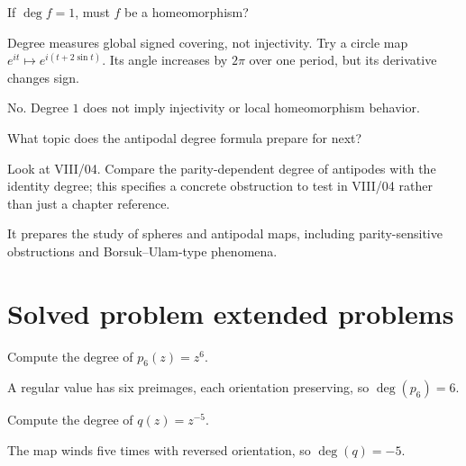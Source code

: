 \begin{exercise}\label{exr:viii03-23}
If \(\deg f=1\), must \(f\) be a homeomorphism?
\end{exercise}
\begin{hint}Degree measures global signed covering, not injectivity.
Try a circle map \(e^{it}\mapsto e^{i(t+2\sin t)}\). Its angle increases by \(2\pi\) over one period, but its derivative changes sign.
\end{hint}
\begin{solution}
No.  Degree \(1\) does not imply injectivity or local homeomorphism behavior.
\end{solution}

\begin{exercise}\label{exr:viii03-24}
What topic does the antipodal degree formula prepare for next?
\end{exercise}
\begin{hint}Look at VIII/04.
Compare the parity-dependent degree of antipodes with the identity degree; this specifies a concrete obstruction to test in VIII/04 rather than just a chapter reference.
\end{hint}
\begin{solution}
It prepares the study of spheres and antipodal maps, including parity-sensitive
obstructions and Borsuk--Ulam-type phenomena.
\end{solution}

\section{Solved problem extended problems}

\begin{problem}\label{prob:viii03-01}
Compute the degree of \(p_6(z)=z^6\).
\end{problem}
\begin{solution}
A regular value has six preimages, each orientation preserving, so
\(\deg(p_6)=6\).
\end{solution}

\begin{problem}\label{prob:viii03-02}
Compute the degree of \(q(z)=z^{-5}\).
\end{problem}
\begin{solution}
The map winds five times with reversed orientation, so \(\deg(q)=-5\).
\end{solution}

